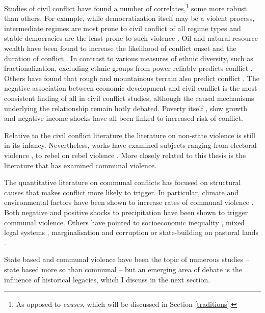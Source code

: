 Studies of civil conflict have found a number of correlates,\footnote{As opposed
to \textit{causes}, which will be discussed in Section \ref{traditions}.} some
more robust than others. For example, while democratization itself may be a
violent process, intermediate regimes are most prone to civil conflict of all
regime types and stable democracies are the least prone to such violence
\citep{Hegre2001, Goldstone_2010}. Oil and natural resource wealth have been
found to increase the likelihood of conflict onset and the duration of conflict
\citep{Lujala2010, Lujala2005, Lujala_2008, Ross_2006}. In contrast to various
measures of ethnic diversity, such as fractionalization, excluding ethnic groups
from power reliably predicts conflict \citep{CedermanLars-Erik2013Igac}. Others
have found that rough and mountainous terrain also predict conflict
\citep{Buhaug_2010, Hegre2006}. The negative association between economic
development and civil conflict is the most consistent finding of all in civil
conflict studies, although the causal mechanisms underlying the relationship
remain hotly debated. Poverty itself \citep{Hegre2006}, slow growth
\citep{Hegre2006} and negative income shocks have all been linked to increased
risk of conflict.

Relative to the civil conflict literature the literature on non-state violence
is still in its infancy. Nevertheless, works have examined subjects ranging from
electoral violence \citep{Fjelde_2020, Salehyan_2014, Burchard_2015}, to rebel
on rebel violence \citep{Fjelde_2012, Lilja_2011, Cunningham_2012, Nygard_2014}.
More closely related to this thesis is the literature that has examined communal
violence.

The quantitative literature on communal conflicts has focused on structural
causes that makes conflict more likely to trigger. In particular, climate and
environmental factors have been shown to increase rates of communal violence
\citep{Turner_2011}. Both negative \citep{Detges_2017, Fjelde2012,
van_Weezel_2019, Petrova_2022} and positive \citep{Theisen2012, Witsenburg2012}
shocks to precipitation have been shown to trigger communal violence. Others
have pointed to socioeconomic inequality \citep{Fjelde2014, PETERS_2004}, mixed
legal systems \citep{Eck2014}, marginalisation and corruption
\citep{BENJAMINSEN_2009} or state-building on pastoral lands
\citep{hagmann2008pastoral}.

State based and communal violence have been the topic of numerous studies --
state based more so than communal -- but an emerging area of debate is the
influence of historical legacies, which I discuss in the next section. 


